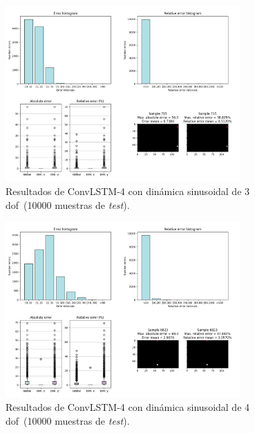 \begin{figure}[H]
		\begin{center}
			\includegraphics[width=0.8\textwidth]{ figures/test_raw/REC/ConvLSTM_complex/sin_var1_100000.png}
			\caption{Resultados de ConvLSTM-4 con dinámica sinusoidal de 3 \acrshort{dof}~(10000 muestras de \textit{test}).}
			\label{fig.raw_convlstm4_sin_var1_100000}
		\end{center}
\end{figure}
\vspace{-30pt}
\begin{figure}[H]
		\begin{center}
			\includegraphics[width=0.8\textwidth]{ figures/test_raw/REC/ConvLSTM_complex/sin_var2_100000.png}
			\caption{Resultados de ConvLSTM-4 con dinámica sinusoidal de 4 \acrshort{dof}~(10000 muestras de \textit{test}).}
			\label{fig.raw_convlstm4_sin_var2_100000}
		\end{center}
\end{figure}
\vspace{-10pt}

